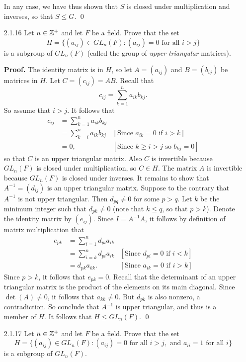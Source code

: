\begin{enumerate}
      In any case, we have thus shown that $S$ is closed under multiplication
      and inverses, so that $S \le G$. \qed
   \item[2.1.16]  Let $n \in \mathbb{Z}^+$ and let $F$ be a field. Prove 
                  that the set
                  $$H = \{(a_{ij}) \in GL_n(F) : (a_{ij}) = 0 \text{ for all }
                     i > j\}$$
                  is a subgroup of $GL_n(F)$ (called the group of
                  \textit{upper triangular} matrices).

      \textbf{Proof.} The identity matrix is in $H$, so let $A = (a_{ij})$ and
      $B = (b_{ij})$ be matrices in $H$. Let $C = (c_{ij}) = AB$. Recall that
      $$c_{ij} = \sum_{k=1}^na_{ik}b_{kj}.$$
      So assume that $i > j$. It follows that
      \begin{align*}
         c_{ij} &= \sum_{k=1}^na_{ik}b_{kj} \\
            &= \sum_{k=i}^na_{ik}b_{kj}
               &[\text{Since }a_{ik} = 0 \text{ if } i > k] \\
            &= 0, &[\text{Since }k \ge i > j \text{ so } b_{kj} = 0]
      \end{align*}
      so that $C$ is an upper triangular matrix. Also $C$ is invertible because
      $GL_n(F)$ is closed under multiplication, so $C \in H$. The matrix $A$ is
      invertible because $GL_n(F)$ is closed under inverses. It remains to show
      that $A^{-1} = (d_{ij})$ is an upper triangular matrix. Suppose to the
      contrary that $A^{-1}$ is not upper triangular. Then $d_{pq} \neq 0$ for
      some $p > q$. Let $k$ be the minimum integer such that $d_{pk} \neq 0$
      (note that $k \le q$, so that $p > k$). Denote the identity matrix by
      $(e_{ij})$. Since $I = A^{-1}A$, it follows by definition of matrix 
      multiplication that
      \begin{align*}
         e_{pk} &= \sum_{i=1}^nd_{pi}a_{ik} \\
           &= \sum_{i=k}^nd_{pi}a_{ik}
               &[\text{Since }d_{pi} = 0 \text{ if } i < k] \\
            &= d_{pk}a_{kk}. &[\text{Since } a_{ik} = 0 \text{ if } i > k]
      \end{align*}
      Since $p > k$, it follows that $e_{pk} = 0$. Recall that the determinant
      of an upper triangular matrix is the product of the elements on its main
      diagonal. Since $\det(A) \neq 0$, it follows that $a_{kk} \neq 0$. But
      $d_{pk}$ is also nonzero, a contradiction. So conclude that $A^{-1}$ is
      upper triangular, and thus is a member of $H$. It follows that
      $H \le GL_n(F)$. \qed
   \item[2.1.17]  Let $n \in \mathbb{Z}^+$ and let $F$ be a field. Prove that the set
                  $$H = \{(a_{ij}) \in GL_n(F) : (a_{ij}) = 0 \text{ for all }
                      i > j, \text{ and } a_{ii} = 1 \text{ for all }i\}$$
                  is a subgroup of $GL_n(F)$.


\end{enumerate}
